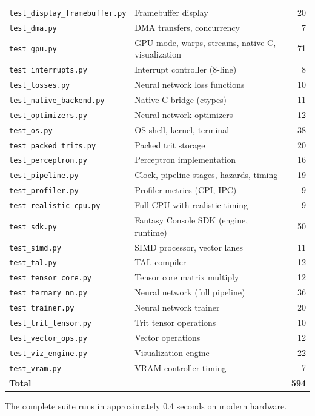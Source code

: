 \documentclass[10pt,a4paper,twoside]{book}
\begin{document}
\begin{longtable}{llr}
\texttt{test\_display\_framebuffer.py} & Framebuffer display & 20 \\
\texttt{test\_dma.py} & DMA transfers, concurrency & 7 \\
\texttt{test\_gpu.py} & GPU mode, warps, streams, native C, visualization & 71 \\
\texttt{test\_interrupts.py} & Interrupt controller (8-line) & 8 \\
\texttt{test\_losses.py} & Neural network loss functions & 10 \\
\texttt{test\_native\_backend.py} & Native C bridge (ctypes) & 11 \\
\texttt{test\_optimizers.py} & Neural network optimizers & 12 \\
\texttt{test\_os.py} & OS shell, kernel, terminal & 38 \\
\texttt{test\_packed\_trits.py} & Packed trit storage & 20 \\
\texttt{test\_perceptron.py} & Perceptron implementation & 16 \\
\texttt{test\_pipeline.py} & Clock, pipeline stages, hazards, timing & 19 \\
\texttt{test\_profiler.py} & Profiler metrics (CPI, IPC) & 9 \\
\texttt{test\_realistic\_cpu.py} & Full CPU with realistic timing & 9 \\
\texttt{test\_sdk.py} & Fantasy Console SDK (engine, runtime) & 50 \\
\texttt{test\_simd.py} & SIMD processor, vector lanes & 11 \\
\texttt{test\_tal.py} & TAL compiler & 12 \\
\texttt{test\_tensor\_core.py} & Tensor core matrix multiply & 12 \\
\texttt{test\_ternary\_nn.py} & Neural network (full pipeline) & 36 \\
\texttt{test\_trainer.py} & Neural network trainer & 20 \\
\texttt{test\_trit\_tensor.py} & Trit tensor operations & 10 \\
\texttt{test\_vector\_ops.py} & Vector operations & 12 \\
\texttt{test\_viz\_engine.py} & Visualization engine & 22 \\
\texttt{test\_vram.py} & VRAM controller timing & 7 \\
\midrule
\textbf{Total} & & \textbf{594} \\
\end{longtable}

The complete suite runs in approximately 0.4 seconds on modern hardware.
\end{document}
